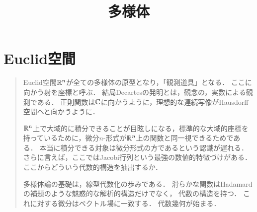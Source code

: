 \documentclass[uplatex,dvipdfmx]{jsreport}
\title{多様体}
\author{}
\begin{document}
\tableofcontents

\chapter{Euclid空間}

\begin{quotation}
    Euclid空間$\mathbb{R}^n$が全ての多様体の原型となり，「観測道具」となる．
    ここに向かう射を座標と呼ぶ．
    結局Decartesの発明とは，観念の，実数による観測である．
    正則関数は$\mathbb{C}$に向かうように，理想的な連続写像がHausdorff空間へと向かうように．

    $\mathbb{R}^n$上で大域的に積分できることが目眩しになる，標準的な大域的座標を持っているために，微分$n$-形式が$\mathbb{R}^n$上の関数と同一視できるためである．
    本当に積分できる対象は微分形式の方であるという認識が遅れる．
    さらに言えば，ここではJacobi行列という最強の数値的特徴づけがある．
    ここからどういう代数的構造を抽出するか．

    多様体論の基礎は，線型代数化の歩みである．
    滑らかな関数はHadamardの補題のような魅惑的な解析的構造だけでなく，
    代数の構造を持つ．
    これに対する微分はベクトル場に一致する．
    代数幾何が始まる．
\end{quotation}
\end{document}
